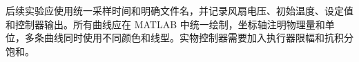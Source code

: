 后续实验应使用统一采样时间和明确文件名，并记录风扇电压、初始温度、设定值和控制器输出。所有曲线应在 MATLAB 中统一绘制，坐标轴注明物理量和单位，多条曲线同时使用不同颜色和线型。实物控制器需要加入执行器限幅和抗积分饱和。
